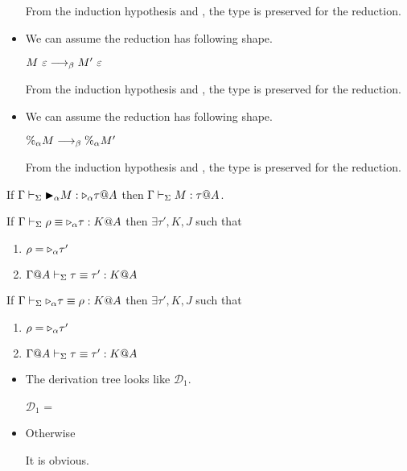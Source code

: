 \begin{itemize}
	      From the induction hypothesis and \TGen, the type is preserved for the reduction.
	      	      
	\item \TIns
	      	      
	      We can assume the reduction has following shape.
	      	      
	      $M\ \varepsilon \longrightarrow_{\beta} M'\ \varepsilon$
	      	      
	      From the induction hypothesis and \TIns, the type is preserved for the reduction.
	      	      
	\item \TCsp
	      	      
	      We can assume the reduction has following shape.
	      	      
	      $\%_\alpha M \longrightarrow_{\beta} \%_\alpha M'$
	      	      
	      From the induction hypothesis and \TCsp, the type is preserved for the reduction.
	      	      
	      \fi
	      	      
\end{itemize}

\begin{lemma}
	\begin{item}
	      \item If $\G \V \TB_\alpha M : \TW_\alpha \tau@A$ then $\Gamma \vdash_\Sigma M : \tau @A$.
	      \item If $\Gamma \vdash_\Sigma \rho \equiv  {\mathop{\triangleright}}_\alpha \tau : K @A$ then $\exists \tau', K, J$ such that
	      \begin{enumerate}
	      	\item $\rho = {\mathop{\triangleright}}_\alpha \tau'$
	      	\item $\Gamma @A\vdash_\Sigma \tau \equiv \tau' : K @A$
	      \end{enumerate}
	      \item If $\Gamma \vdash_\Sigma {\mathop{\triangleright}}_\alpha \tau \equiv \rho : K @A$ then $\exists \tau', K, J$ such that
	      \begin{enumerate}
	      	\item $\rho = {\mathop{\triangleright}}_\alpha \tau'$
	      	\item $\Gamma @A\vdash_\Sigma \tau \equiv \tau' : K @A$
	      \end{enumerate}
	\end{item}
\end{lemma}

\begin{itemize}
	\item \TTB
	      	      
	      The derivation tree looks like $\mathcal{D}_1$.
	      	      
	      $\mathcal{D}_1$ = 
	      {}
	      	      
	\item Otherwise
	      	      
	      It is obvious.
	      	      
\end{itemize}

